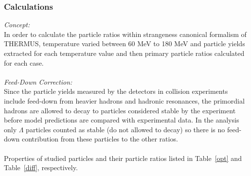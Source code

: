 \subsubsection{Calculations}
\textit{Concept:} \\In order to calculate the particle ratios within strangeness canonical formalism of THERMUS, temperature varied between 60 MeV to 180 MeV and particle yields extracted for each temperature value and then primary particle ratios calculated for each case. \\ \\
\textit{Feed-Down Correction:} \\Since the particle yields measured by the detectors in collision experiments include feed-down from heavier hadrons and hadronic resonances, the primordial hadrons are allowed to decay to particles considered stable by the experiment before model predictions are compared with experimental data. In the analysis only  $\Lambda$ particles counted as stable (do not allowed to decay) so there is no feed-down contribution from these particles to the other ratios.  \\ \\

Properties of studied particles and their particle ratios listed in Table~\ref{opt} and Table~\ref{diff}, respectively. 

